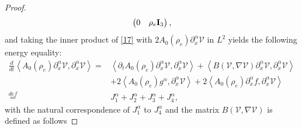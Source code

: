 \documentclass[reqno,twoside,12pt,a4paper]{amsart}
\newcommand{\al}{\alpha}
\newcommand{\pt}{\partial_t}
\newcommand{\pa}{\partial}
\numberwithin{equation}{section}
\begin{document}
\begin{proof}
\begin{equation*}
\begin{pmatrix}
    0 & \rho_e {\bf{I}}_3
    \end{pmatrix},
\end{equation*}
and taking the inner product of \eqref{17} with $2A_0(\rho_e)\pa_x^\al \mathcal{V}$ in $L^2$ yields the following energy equality:
\begin{equation}\label{18}
\begin{aligned}
    \frac{d}{dt} \left< A_0(\rho_e)\pa_x^\al \mathcal{V}, \pa_x^\al \mathcal{V} \right> = & \left< \pt A_0(\rho_e)\pa_x^\al \mathcal{V}, \pa_x^\al \mathcal{V} \right>+\left<  B(\mathcal{V},\nabla\mathcal{V})\pa_x^\al \mathcal{V}, \pa_x^\al \mathcal{V} \right>\\
    & +2\left<  A_0(\rho_e)g^\alpha, \pa_x^\al \mathcal{V} \right>+2\left<  A_0(\rho_e)\pa_x^\al f, \pa_x^\al \mathcal{V} \right>\\
    \overset{def}{=}& J_1^\alpha+J_2^\alpha+J_3^\alpha+J_4^\alpha,
\end{aligned}
\end{equation}
with the natural correspondence of $J_1^\alpha$ to $J_4^\alpha$ and the matrix $B(\mathcal{V},\nabla\mathcal{V})$ is defined as follows


\end{proof}
\end{document}
